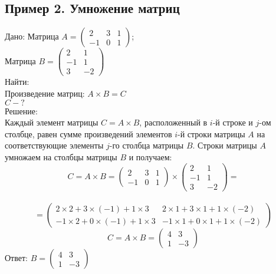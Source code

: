 \documentclass[a4paper,12pt]{article} %
\begin{document}
\begin{flushleft}
\section*{Пример 2. Умножение матриц}
Дано: Матрица
$ A=\begin{pmatrix}
2 & 3 & 1 \\
-1 & 0 & 1
\end{pmatrix} $; \\
Матрица
$ B=\begin{pmatrix}
2 & 1 \\
-1 & 1 \\
3 & -2
\end{pmatrix} $ \\
Найти:\\
Произведение матриц: $A \times B=C$ \\
$C-?$ \\
Решение:\\
Каждый элемент матрицы $C=A \times B$, расположенный в $i$-й строке и $j$-ом столбце, равен сумме произведений элементов $i$-й строки матрицы $A$ на соответствующие элементы $j$-го столбца матрицы $B$. Строки матрицы $A$ умножаем на столбцы матрицы $B$ и получаем:\\
$$C=A \times B=\begin{pmatrix}
2 & 3 & 1 \\
-1 & 0 & 1
\end{pmatrix} \times \begin{pmatrix}
2 & 1 \\
-1 & 1 \\
3 & -2
\end{pmatrix} =$$\\
$$=\begin{pmatrix}
2 \times 2+3 \times (-1)+1 \times 3 & 2 \times 1+3 \times 1+1 \times (-2) \\
-1 \times 2+0 \times (-1)+1 \times 3 & -1 \times 1+0 \times 1+1 \times (-2)
\end{pmatrix}$$
$$C=A \times B=\begin{pmatrix}
4 & 3 \\
1 & -3
\end{pmatrix}
$$
Ответ: $B=\begin{pmatrix}
4 & 3 \\
1 & -3
\end{pmatrix}$



\end{flushleft}
\end{document}
